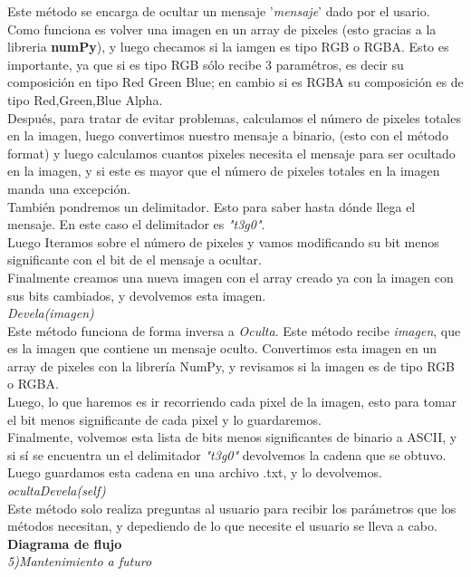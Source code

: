 \documentclass[paper=a4, fontsize=11pt, spanish]{scrartcl}
\numberwithin{equation}{section}
\numberwithin{figure}{section}
\numberwithin{table}{section}
\begin{document}
Este método se encarga de ocultar un mensaje '\textit{mensaje}' dado por el usario. Como funciona es volver una imagen en un array de pixeles (esto gracias a la libreria \textbf{numPy}), y luego checamos si la iamgen es tipo RGB o RGBA. Esto es importante, ya que si es tipo RGB sólo recibe 3 paramétros, es decir su composición en tipo Red Green Blue; en cambio si es RGBA su composición es de tipo Red,Green,Blue Alpha.\\
Después, para tratar de evitar problemas, calculamos el número de pixeles totales en la imagen, luego convertimos nuestro mensaje a binario,
(esto con el método format) y luego calculamos cuantos pixeles necesita el mensaje para ser ocultado en la imagen, y si este es mayor que el número de pixeles totales en la imagen manda una excepción.\\
También pondremos un delimitador. Esto para saber hasta dónde llega el mensaje. En este caso el delimitador es \textit{"t3g0"}.\\
Luego Iteramos sobre el número de pixeles y vamos modificando su bit menos significante con el bit de el mensaje a ocultar.\\
        Finalmente creamos una nueva imagen con el array creado ya con la imagen con sus bits cambiados, y devolvemos esta imagen.\\
\textit{Devela(imagen)}\\
Este método funciona de forma inversa a \textit{Oculta}. Este método recibe \textit{imagen}, que es la imagen que contiene un mensaje oculto. Convertimos esta imagen en un array de pixeles con la librería NumPy, y revisamos si la imagen es de tipo RGB o RGBA.\\
Luego, lo que haremos es ir recorriendo cada pixel de la imagen, esto para tomar el bit menos significante de cada pixel y lo guardaremos.\\
Finalmente, volvemos esta lista de bits menos significantes de binario a ASCII, y si sí se encuentra un el delimitador \textit{"t3g0"} devolvemos la cadena que se obtuvo.\\
Luego guardamos esta cadena en una archivo .txt, y lo devolvemos.\\
\textit{ocultaDevela(self)}\\
Este método solo realiza preguntas al usuario para recibir los parámetros que los métodos necesitan, y depediendo de lo que necesite el usuario se lleva a cabo.\\
\textbf{Diagrama de flujo}\\
\textit{5)Mantenimiento a futuro}\\
\end{document}
